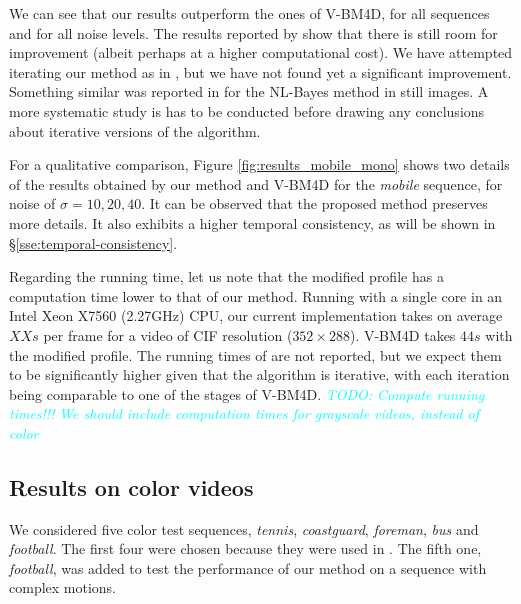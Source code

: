 \documentclass[10pt, journal, twocolumn, final, a4paper]{IEEEtran}
\newcommand{\pa}[1]{\textcolor{cyan}{#1}}
\newcommand{\pcomment}[1]{\textit{\pa{#1}}}
\begin{document}
We can see that our results outperform the ones of V-BM4D, for all sequences and 
for all noise levels. The results reported by \cite{LiZhangDai2011} show that there
is still room for improvement (albeit perhaps at a higher computational cost).
%
We have attempted iterating our method as in \cite{LiZhangDai2011},
but we have not found yet a significant improvement. Something similar was
reported in \cite{Lebrun2013ipol,Lebrun2013a} for the NL-Bayes method in still
images. %
A more systematic study is has to be conducted before drawing any
conclusions about iterative versions of the algorithm.

For a qualitative comparison, Figure \ref{fig:results_mobile_mono}
shows two details of the results obtained by our method and V-BM4D for the
\emph{mobile} sequence, for noise of $\sigma = 10, 20, 40$. It can be observed
that the proposed method preserves more details. It also exhibits a higher
temporal consistency, as will be shown in \S \ref{sse:temporal-consistency}.


Regarding the running time, let us note that the modified profile has a
computation time lower to that of our method. Running with a
single core in an Intel Xeon X7560 (2.27GHz) CPU, 
our current implementation takes on average $XXs$ per frame for a video of CIF
resolution ($352\times288$). V-BM4D takes $44s$ with the modified profile.
The running times of \cite{LiZhangDai2011} are not reported, but we expect them
to be significantly higher given that the algorithm is iterative, with each iteration 
being comparable to one of the stages of V-BM4D.
\pcomment{TODO: Compute running times!!!}
\pcomment{We should include computation times for grayscale videos, instead of color}


\subsection{Results on color videos}

We considered five color test sequences, \emph{tennis}, \emph{coastguard},
\emph{foreman}, \emph{bus} and \emph{football}. The first four were chosen
because they were used in \cite{Maggioni2012}. The fifth one, \emph{football},
was added to test the performance of our method on a sequence with complex motions.
\end{document}
